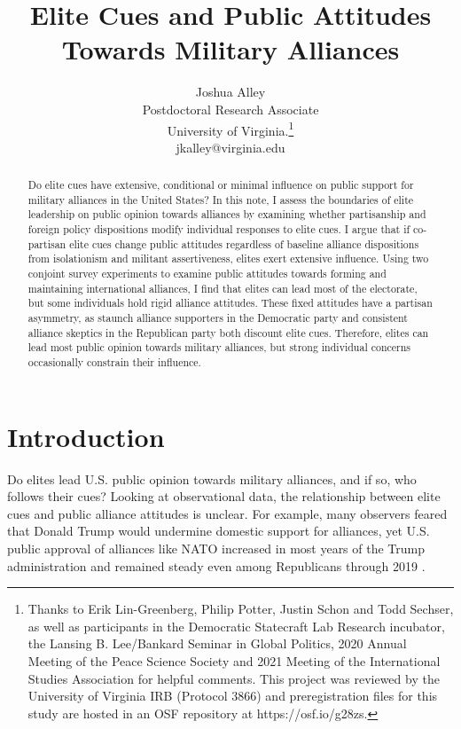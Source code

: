 \documentclass[12pt]{article}
\title{\textbf{Elite Cues and Public Attitudes Towards Military Alliances}}
\author{Joshua Alley \\
Postdoctoral Research Associate \\
University of Virginia.\thanks{Thanks to Erik Lin-Greenberg, Philip Potter, Justin Schon and Todd Sechser, as well as participants in the Democratic Statecraft Lab Research incubator, the Lansing B. Lee/Bankard Seminar in Global Politics, 2020 Annual Meeting of the Peace Science Society and 2021 Meeting of the International Studies Association for helpful comments. 
This project was reviewed by the University of Virginia IRB (Protocol 3866) and preregistration files for this study are hosted in an OSF repository at https://osf.io/g28zs.} \\
jkalley@virginia.edu
}
\date{}
\begin{document}
\maketitle 

\doublespace 

\begin{abstract}
Do elite cues have extensive, conditional or minimal influence on public support for military alliances in the United States? 
In this note, I assess the boundaries of elite leadership on public opinion towards alliances by examining whether partisanship and foreign policy dispositions modify individual responses to elite cues.
I argue that if co-partisan elite cues change public attitudes regardless of baseline alliance dispositions from isolationism and militant assertiveness, elites exert extensive influence. 
Using two conjoint survey experiments to examine public attitudes towards forming and maintaining international alliances, I find that elites can lead most of the electorate, but some individuals hold rigid alliance attitudes. 
These fixed attitudes have a partisan asymmetry, as staunch alliance supporters in the Democratic party and consistent alliance skeptics in the Republican party both discount elite cues.  
Therefore, elites can lead most public opinion towards military alliances, but strong individual concerns occasionally constrain their influence.  
\end{abstract}


\newpage 


\section{Introduction}


Do elites lead U.S. public opinion towards military alliances, and if so, who follows their cues?
Looking at observational data, the relationship between elite cues and public alliance attitudes is unclear.
For example, many observers feared that Donald Trump would undermine domestic support for alliances, yet U.S. public approval of alliances like NATO increased in most years of the Trump administration and remained steady even among Republicans through 2019 \citep{PewNATO2020}.
\end{document}
